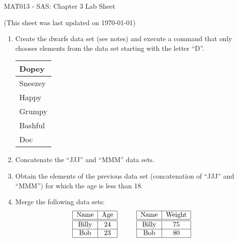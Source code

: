 \documentclass[12pt]{article}
\begin{document}
\begin{center}
\huge{MAT013 - SAS: Chapter 3 Lab Sheet}\\
\begin{center}
\tiny{(This sheet was last updated on \today)}
\end{center}
\end{center}

\begin{enumerate}
\item Create the dwarfs data set (see notes) and execute a command that only chooses elements from the data set starting with the letter ``D''.
\begin{center}
\begin{tabular}{|l|}
\hline
Dopey\\
\hline
Sneezey\\
\hline
Happy\\
\hline
Grumpy\\
\hline
Bashful\\
\hline
Doc\\
\hline
\end{tabular}
\end{center}
\item Concatenate the ``JJJ'' and ``MMM'' data sets.
\item Obtain the elements of the previous data set (concatenation of ``JJJ'' and ``MMM'') for which the age is less than 18.
\item Merge the following data sets:
$$\begin{array}{c@{\hspace{1cm}}c}
\begin{tabular}{|c|c|}
\hline
Name&Age\\\hline\hline
Billy&24\\\hline
Bob&23\\\hline
\end{tabular}&
\begin{tabular}{|c|c|}
\hline
Name&Weight\\\hline\hline
Billy&75\\\hline
Bob&80\\\hline
\end{tabular}\end{array}
$$
 

\end{enumerate}
\end{document}
